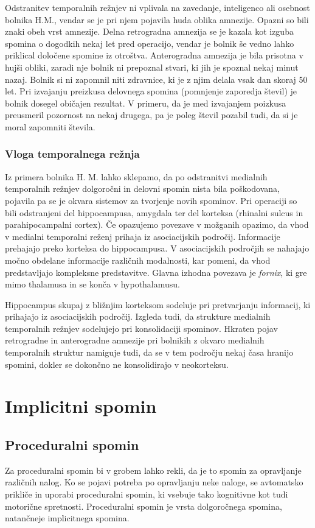 \documentclass[10pt,a4paper]{article}
\begin{document}
Odstranitev temporalnih režnjev ni vplivala na zavedanje, inteligenco ali osebnost bolnika H.M., vendar se je pri njem pojavila huda oblika amnezije. Opazni so bili znaki obeh vrst amnezije. Delna retrogradna amnezija se je kazala kot izguba spomina o dogodkih nekaj let pred operacijo, vendar je bolnik še vedno lahko priklical določene spomine iz otroštva. Anterogradna amnezija je bila prisotna v hujši obliki, zaradi nje bolnik ni prepoznal stvari, ki jih je spoznal nekaj minut nazaj. Bolnik si ni zapomnil niti zdravnice, ki je z njim delala vsak dan skoraj 50 let. Pri izvajanju preizkusa delovnega spomina (pomnjenje zaporedja števil) je bolnik dosegel običajen rezultat. V primeru, da je med izvajanjem poizkusa preusmeril pozornost na nekaj drugega, pa je poleg števil pozabil tudi, da si je moral zapomniti števila.

\subsubsection{Vloga temporalnega režnja}
Iz primera bolnika H. M. lahko sklepamo, da po odstranitvi medialnih temporalnih režnjev dolgoročni in delovni spomin nista bila poškodovana, pojavila pa se je okvara sistemov za tvorjenje novih spominov. Pri operaciji so bili odstranjeni del hippocampusa, amygdala ter del korteksa (rhinalni sulcus in parahipocampalni cortex). Če opazujemo povezave v možganih opazimo, da vhod v medialni temporalni reženj prihaja iz asociacijskih področij. Informacije prehajajo preko korteksa do hippocampusa. V asociacijskih področjih se nahajajo močno obdelane informacije različnih modalnosti, kar pomeni, da vhod predstavljajo kompleksne predstavitve. Glavna izhodna povezava je {\it fornix}, ki gre mimo thalamusa in se konča v hypothalamusu.

Hippocampus skupaj z bližnjim korteksom sodeluje pri pretvarjanju informacij, ki prihajajo iz asociacijskih področij. Izgleda tudi, da strukture medialnih temporalnih režnjev sodelujejo pri konsolidaciji spominov. Hkraten pojav retrogradne in anterogradne amnezije pri bolnikih z okvaro medialnih temporalnih struktur namiguje tudi, da se v tem področju nekaj časa hranijo spomini, dokler se dokončno ne konsolidirajo v neokorteksu. 

\section{Implicitni spomin}
\subsection{Proceduralni spomin}
Za proceduralni spomin bi v grobem lahko rekli, da je to spomin za opravljanje različnih nalog. Ko se pojavi potreba po opravljanju neke naloge, se avtomatsko prikliče in uporabi proceduralni spomin, ki vsebuje tako kognitivne kot tudi motorične spretnosti. Proceduralni spomin je vrsta dolgoročnega spomina, natančneje implicitnega spomina.
\end{document}
